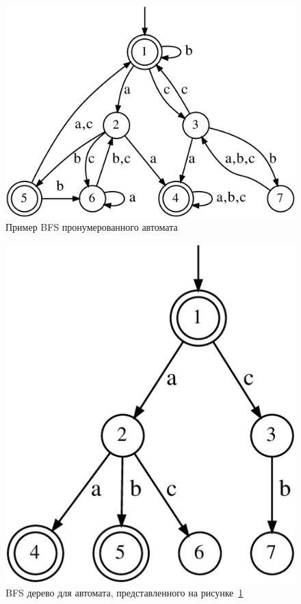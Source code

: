 \begin{figure}[ht]
  \centering
  \includegraphics[scale=0.15]{img/datamod/BFS-example.eps}
  \caption{Пример BFS пронумерованного автомата}
  \label{img:bfs-ex}
\end{figure}

\begin{figure}[ht]
  \centering
  \includegraphics[scale=0.15]{img/datamod/BFS-tree.eps}
  \caption{BFS дерево для автомата, представленного на рисунке~\ref{img:bfs-ex}}
  \label{img:bfs-tree-ex}
\end{figure}

